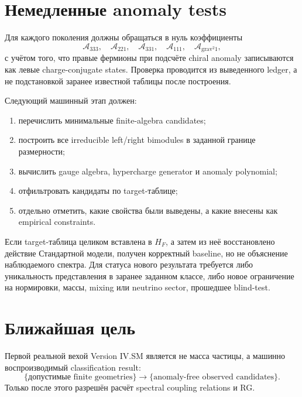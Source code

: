 \section{Немедленные anomaly tests}

Для каждого поколения должны обращаться в нуль коэффициенты
\begin{equation}
 \mathcal A_{333},\quad
 \mathcal A_{221},\quad
 \mathcal A_{331},\quad
 \mathcal A_{111},\quad
 \mathcal A_{\mathrm{grav}^2 1},
\end{equation}
с учётом того, что правые фермионы при подсчёте chiral anomaly записываются
как левые charge-conjugate states. Проверка проводится из выведенного
ledger, а не подстановкой заранее известной таблицы после построения.

\begin{protocol}
Следующий машинный этап должен:
\begin{enumerate}
 \item перечислить минимальные finite-algebra candidates;
 \item построить все irreducible left/right bimodules в заданной границе
 размерности;
 \item вычислить gauge algebra, hypercharge generator и anomaly polynomial;
 \item отфильтровать кандидаты по target-таблице;
 \item отдельно отметить, какие свойства были выведены, а какие внесены как
 empirical constraints.
\end{enumerate}
\end{protocol}

\begin{nogocriterion}
Если target-таблица целиком вставлена в \(H_F\), а затем из неё
восстановлено действие Стандартной модели, получен корректный baseline, но
не объяснение наблюдаемого спектра. Для статуса нового результата требуется
либо уникальность представления в заранее заданном классе, либо новое
ограничение на нормировки, массы, mixing или neutrino sector, прошедшее
blind-test.
\end{nogocriterion}

\section{Ближайшая цель}

Первой реальной вехой Version IV.SM является не масса частицы, а
машинно воспроизводимый classification result:
\begin{equation}
 \{\text{допустимые finite geometries}\}
 \longrightarrow
 \{\text{anomaly-free observed candidates}\}.
\end{equation}
Только после этого разрешён расчёт spectral coupling relations и RG.